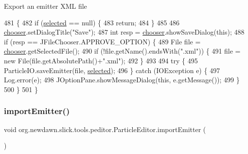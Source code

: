Export an emitter X\+ML file 
\begin{DoxyCode}
481                                 \{
482         \textcolor{keywordflow}{if} (\mbox{\hyperlink{classorg_1_1newdawn_1_1slick_1_1tools_1_1peditor_1_1_particle_editor_ac63e919aceff5c0b0c3b9a307b5f079a}{selected}} == null) \{
483             \textcolor{keywordflow}{return};
484         \}
485 
486         \mbox{\hyperlink{classorg_1_1newdawn_1_1slick_1_1tools_1_1peditor_1_1_particle_editor_a7a921beab5e50d8482810cf42136ee17}{chooser}}.setDialogTitle(\textcolor{stringliteral}{"Save"});
487         \textcolor{keywordtype}{int} resp = \mbox{\hyperlink{classorg_1_1newdawn_1_1slick_1_1tools_1_1peditor_1_1_particle_editor_a7a921beab5e50d8482810cf42136ee17}{chooser}}.showSaveDialog(\textcolor{keyword}{this});
488         \textcolor{keywordflow}{if} (resp == JFileChooser.APPROVE\_OPTION) \{
489             File file = \mbox{\hyperlink{classorg_1_1newdawn_1_1slick_1_1tools_1_1peditor_1_1_particle_editor_a7a921beab5e50d8482810cf42136ee17}{chooser}}.getSelectedFile();
490             \textcolor{keywordflow}{if} (!file.getName().endsWith(\textcolor{stringliteral}{".xml"})) \{
491                 file = \textcolor{keyword}{new} File(file.getAbsolutePath()+\textcolor{stringliteral}{".xml"});
492             \}
493             
494             \textcolor{keywordflow}{try} \{
495                 ParticleIO.saveEmitter(file, \mbox{\hyperlink{classorg_1_1newdawn_1_1slick_1_1tools_1_1peditor_1_1_particle_editor_ac63e919aceff5c0b0c3b9a307b5f079a}{selected}});
496             \} \textcolor{keywordflow}{catch} (IOException e) \{
497                 Log.error(e);
498                 JOptionPane.showMessageDialog(\textcolor{keyword}{this}, e.getMessage());
499             \}
500         \}
501     \}
\end{DoxyCode}
\mbox{\label{classorg_1_1newdawn_1_1slick_1_1tools_1_1peditor_1_1_particle_editor_a8afbd02f370ac64f0b5b3ec8e985c0ca}} 
\subsubsection{\texorpdfstring{import\+Emitter()}{importEmitter()}}
{\footnotesize\ttfamily void org.\+newdawn.\+slick.\+tools.\+peditor.\+Particle\+Editor.\+import\+Emitter (\begin{DoxyParamCaption}{ }\end{DoxyParamCaption})\hspace{0.3cm}{\ttfamily [inline]}}

